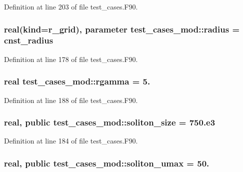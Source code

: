 Definition at line 203 of file test\-\_\-cases.\-F90.

\subsubsection[{radius}]{\setlength{\rightskip}{0pt plus 5cm}real(kind=r\-\_\-grid), parameter test\-\_\-cases\-\_\-mod\-::radius = cnst\-\_\-radius\hspace{0.3cm}{\ttfamily [private]}}\label{classtest__cases__mod_aaab38fce650165338c7b083b6d69fe14}


Definition at line 178 of file test\-\_\-cases.\-F90.

\subsubsection[{rgamma}]{\setlength{\rightskip}{0pt plus 5cm}real test\-\_\-cases\-\_\-mod\-::rgamma = 5.\hspace{0.3cm}{\ttfamily [private]}}\label{classtest__cases__mod_a414edbd9fc49e5bf42449aa09ea4b4b5}


Definition at line 188 of file test\-\_\-cases.\-F90.

\subsubsection[{soliton\-\_\-size}]{\setlength{\rightskip}{0pt plus 5cm}real, public test\-\_\-cases\-\_\-mod\-::soliton\-\_\-size = 750.e3}\label{classtest__cases__mod_aae86f201bdb1a209b7a9c0e26a39feda}


Definition at line 184 of file test\-\_\-cases.\-F90.

\subsubsection[{soliton\-\_\-umax}]{\setlength{\rightskip}{0pt plus 5cm}real, public test\-\_\-cases\-\_\-mod\-::soliton\-\_\-umax = 50.}\label{classtest__cases__mod_a6691463cf0a75416609c200f6cc0bc62}


